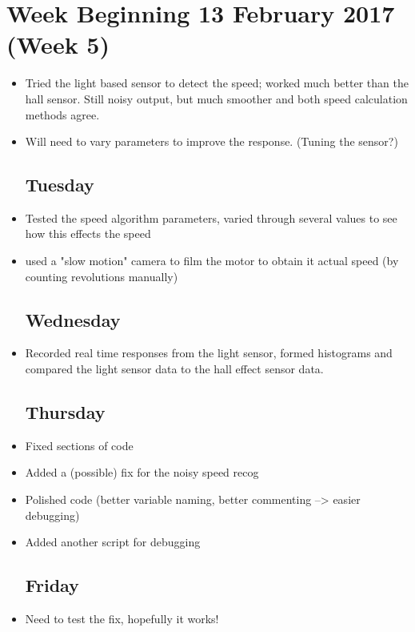 \documentclass[a4]{report}
\begin{document}
	\section{Week Beginning 13 February 2017 (Week 5)}
	\begin{itemize}
		\subsection*{Monday}
		\item Tried the light based sensor to detect the speed; worked much better than the hall sensor. Still noisy output, but much smoother and both speed calculation methods agree. 
		\item Will need to vary parameters to improve the response. (Tuning the sensor?)
		\subsection*{Tuesday}
		\item Tested the speed algorithm parameters, varied through several values to see how this effects the speed
		\item used a "slow motion" camera to film the motor to obtain it actual speed (by counting revolutions manually)
		\subsection*{Wednesday}
		\item Recorded real time responses from the light sensor, formed histograms and compared the light sensor data to the hall effect sensor data.
		\subsection*{Thursday}
		\item Fixed sections of code
		\item Added a (possible) fix for the noisy speed recog
		\item Polished code (better variable naming, better commenting --> easier debugging)
		\item Added another script for debugging
		\subsection*{Friday}
		\item Need to test the fix, hopefully it works!
	\end{itemize}
	\newpage
\end{document}
